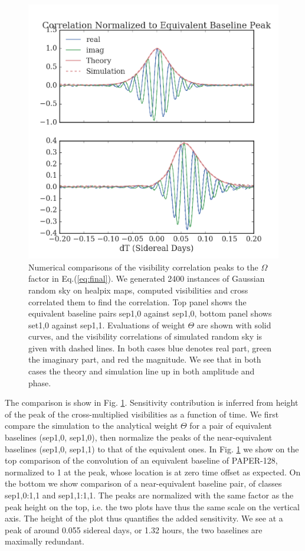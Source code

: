 \documentclass[twocolumn,apj,numberedappendix]{emulateapj}
\renewcommand\[{\begin{equation}}
\renewcommand\]{\end{equation}}
\begin{document}
\begin{figure}[h]
\includegraphics[width=\linewidth]{opp}

\caption{Numerical comparisons of the visibility correlation peaks to the $\Omega$ factor in Eq.(\ref{eq:final}). We generated 2400 instances of Gaussian random sky on healpix maps, computed visibilities and cross correlated them to find the correlation.  Top panel shows the equivalent baseline pairs sep1,0 against sep1,0, bottom panel shows set1,0 against sep1,1.  Evaluations of weight $\Theta$ are shown with solid curves, and the visibility correlations of simulated random sky is given with dashed lines. In both cases blue denotes real part, green the imaginary part, and red the magnitude. We see that in both cases the theory and simulation line up in both amplitude and phase.}
\label{fig:numerics}
\end{figure}


The comparison is show in Fig. \ref{fig:numerics}. 
Sensitivity contribution is inferred from height of the peak of the cross-multiplied visibilities as a function of time. 
We first compare the simulation to the analytical weight $\Theta$ for a pair of equivalent baselines (sep1,0, sep1,0), then normalize the peaks 
of the near-equivalent baselines (sep1,0, sep1,1) to that of the equivalent ones. 
In Fig. \ref{fig:numerics}  we show on the top comparison of
the convolution of an equivalent baseline of PAPER-128, normalized to 1 at the
peak, whose location is at zero time offset as expected. On the bottom we show
comparison of a near-equivalent baseline pair, of classes sep1,0:1,1 and sep1,1:1,1. The peaks
are normalized with the same factor as the peak height on the top,
i.e. the two plots have thus the same scale on the vertical axis.
The height of the plot thus quantifies the added sensitivity. We see at a peak of around 0.055 sidereal days, or 1.32 hours, the two baselines are maximally redundant. 
\end{document}
